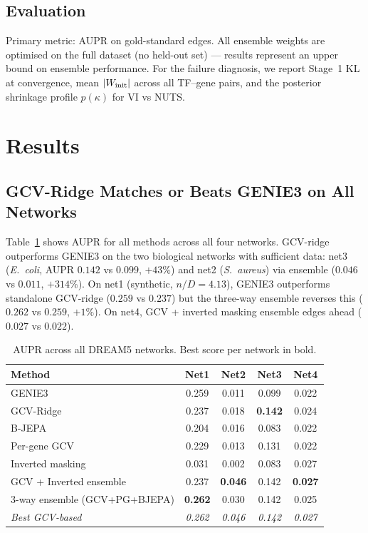 \documentclass[11pt]{article}
\begin{document}
\subsection{Evaluation}

Primary metric: AUPR on gold-standard edges.
All ensemble weights are optimised on the full dataset (no held-out set) ---
results represent an upper bound on ensemble performance.
For the failure diagnosis, we report Stage~1 KL at convergence, mean $|W_{\rm init}|$
across all TF--gene pairs, and the posterior shrinkage profile $p(\kappa)$
for VI vs NUTS.

\section{Results}

\subsection{GCV-Ridge Matches or Beats GENIE3 on All Networks}

Table~\ref{tab:main} shows AUPR for all methods across all four networks.
GCV-ridge outperforms GENIE3 on the two biological networks with sufficient
data: net3 (\textit{E.~coli}, AUPR $0.142$ vs $0.099$, $+43\%$) and net2
(\textit{S.~aureus}) via ensemble ($0.046$ vs $0.011$, $+314\%$).
On net1 (synthetic, $n/D = 4.13$), GENIE3 outperforms standalone GCV-ridge
($0.259$ vs $0.237$) but the three-way ensemble reverses this ($0.262$
vs $0.259$, $+1\%$).
On net4, GCV + inverted masking ensemble edges ahead ($0.027$ vs $0.022$).

\begin{table}[h]
\centering
\caption{AUPR across all DREAM5 networks. Best score per network in bold.}
\label{tab:main}
\begin{tabular}{lcccc}
\toprule
Method & Net1 & Net2 & Net3 & Net4 \\
\midrule
GENIE3                      & 0.259          & 0.011 & 0.099          & 0.022 \\
GCV-Ridge                   & 0.237          & 0.018 & \textbf{0.142} & 0.024 \\
B-JEPA                      & 0.204          & 0.016 & 0.083          & 0.022 \\
Per-gene GCV                & 0.229          & 0.013 & 0.131          & 0.022 \\
Inverted masking            & 0.031          & 0.002 & 0.083          & 0.027 \\
GCV + Inverted ensemble     & 0.237          & \textbf{0.046} & 0.142 & \textbf{0.027} \\
3-way ensemble (GCV+PG+BJEPA) & \textbf{0.262} & 0.030 & 0.142 & 0.025 \\
\midrule
\textit{Best GCV-based}     & \textit{0.262} & \textit{0.046} & \textit{0.142} & \textit{0.027} \\
\bottomrule
\end{tabular}
\end{table}
\end{document}
